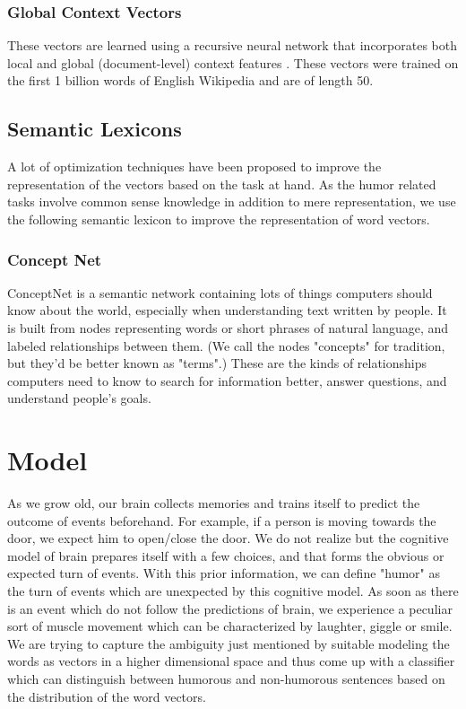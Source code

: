 \documentclass{acm_proc_article-sp}
\begin{document}
\subsubsection{Global Context Vectors}

These vectors are learned using a recursive neural network \cite{socher2011semi} that incorporates both local and global (document-level) context features \cite{maas2011learning}. These vectors were trained on the first 1 billion words of English Wikipedia and are of length 50.



\subsection{ Semantic Lexicons}

A lot of optimization techniques have been proposed to improve the representation of the vectors based on the task at hand. As the humor related tasks involve common sense knowledge in addition to mere representation, we use the following semantic lexicon to improve the representation of word vectors. 

\subsubsection{Concept Net }
ConceptNet is a semantic network containing lots of things computers should know about the world, especially when understanding text written by people.
It is built from nodes representing words or short phrases of natural language, and labeled relationships between them. (We call the nodes "concepts" for tradition, but they'd be better known as "terms".) These are the kinds of relationships computers need to know to search for information better, answer questions, and understand people's goals.

\section{Model}


As we grow old, our brain collects memories and trains itself to predict the outcome of events beforehand. For example, if a person is moving towards the door, we expect him to open/close the door. We do not realize but the cognitive model of brain prepares itself with a few choices, and that forms the obvious or expected turn of events. With this prior information, we can define "humor" as the turn of events which are unexpected by this cognitive model. As soon as there is an event which do not follow the predictions of brain, we experience a peculiar sort of muscle movement which can be characterized by laughter, giggle or smile. We are trying to capture the ambiguity just mentioned by suitable modeling the words as vectors in a higher dimensional space and thus come up with a classifier which can distinguish between humorous and non-humorous sentences based on the distribution of the word vectors.
\end{document}
